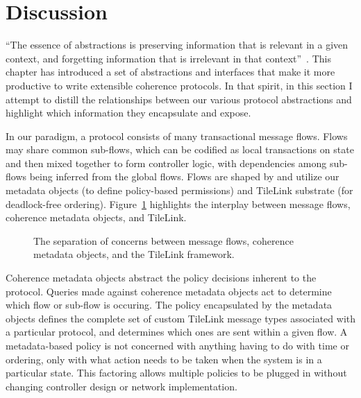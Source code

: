 
\section{Discussion}

``The essence of abstractions is preserving information that is relevant in a given context, and forgetting information that is irrelevant in that context''~\cite{guttag2014introduction}.
This chapter has introduced a set of abstractions and interfaces that make it more productive to write extensible coherence protocols.
In that spirit, in this section I attempt to distill the relationships between our various protocol abstractions and highlight which information they encapsulate and expose.


In our paradigm, a protocol consists of many transactional message flows.
Flows may share common sub-flows, which can be codified as local transactions on state
and then mixed together to form controller logic,
with dependencies among sub-flows being inferred from the global flows.
Flows are shaped by and utilize our metadata objects (to define policy-based permissions)
and TileLink substrate (for deadlock-free ordering).
Figure~\ref{fig:overview} highlights the interplay between message flows, coherence metadata objects, and TileLink.

\begin{figure}[t!]
\centering
\caption[Separation of Concerns.]{
The separation of concerns between message flows, coherence metadata objects, and the TileLink framework.
}
\label{fig:overview}
\end{figure}

Coherence metadata objects abstract the policy decisions inherent to the protocol.
Queries made against coherence metadata objects act to determine which flow or sub-flow is occuring.
The policy encapsulated by the metadata objects defines the complete set of custom TileLink message types
associated with a particular protocol,
and determines which ones are sent within a given flow.
A metadata-based policy is not concerned with anything having to do with time or ordering,
only with what action needs to be taken when the system is in a particular state.
This factoring allows multiple policies to be plugged in without changing controller design
or network implementation.

